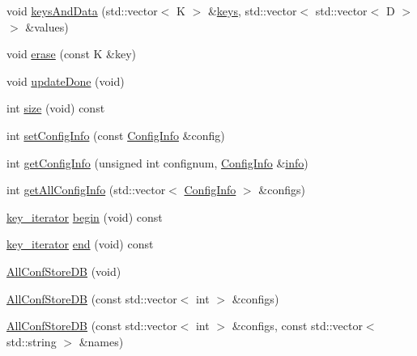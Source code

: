 \begin{DoxyCompactItemize}
void \mbox{\hyperlink{classFILEDB_1_1AllConfStoreDB_a9150983c712d6b870a75886f92b10a9d}{keys\+And\+Data}} (std\+::vector$<$ K $>$ \&\mbox{\hyperlink{classFILEDB_1_1ConfDataStoreDB_a794e05e3888ab95e0396a196b5a18e65}{keys}}, std\+::vector$<$ std\+::vector$<$ D $>$ $>$ \&values)
\item 
void \mbox{\hyperlink{classFILEDB_1_1AllConfStoreDB_afb092d33f9ca14ca30918d6cb8251fdb}{erase}} (const K \&key)
\item 
void \mbox{\hyperlink{classFILEDB_1_1AllConfStoreDB_ac90e596f6c914145130719ec5ac13593}{update\+Done}} (void)
\item 
int \mbox{\hyperlink{classFILEDB_1_1AllConfStoreDB_a78dd830c5211b3b00b8eae6170ffc9d6}{size}} (void) const
\item 
int \mbox{\hyperlink{classFILEDB_1_1AllConfStoreDB_a2062f555d190a3c52cc942447a090b8a}{set\+Config\+Info}} (const \mbox{\hyperlink{classFILEDB_1_1ConfigInfo}{Config\+Info}} \&config)
\item 
int \mbox{\hyperlink{classFILEDB_1_1AllConfStoreDB_a351639b9e19297abfa7b8b1aca013770}{get\+Config\+Info}} (unsigned int confignum, \mbox{\hyperlink{classFILEDB_1_1ConfigInfo}{Config\+Info}} \&\mbox{\hyperlink{structinfo}{info}})
\item 
int \mbox{\hyperlink{classFILEDB_1_1AllConfStoreDB_aeb8e6daf1a1f9b7a19899cf7db365632}{get\+All\+Config\+Info}} (std\+::vector$<$ \mbox{\hyperlink{classFILEDB_1_1ConfigInfo}{Config\+Info}} $>$ \&configs)
\item 
\mbox{\hyperlink{classFILEDB_1_1AllConfStoreDB_a2ce8981ca7049ed0c2c6e438873a9c1b}{key\+\_\+iterator}} \mbox{\hyperlink{classFILEDB_1_1AllConfStoreDB_a7bb7f812d80471897860af5692eb5bd2}{begin}} (void) const
\item 
\mbox{\hyperlink{classFILEDB_1_1AllConfStoreDB_a2ce8981ca7049ed0c2c6e438873a9c1b}{key\+\_\+iterator}} \mbox{\hyperlink{classFILEDB_1_1AllConfStoreDB_a213c914b326e7769411e305ceb375b1d}{end}} (void) const
\item 
\mbox{\hyperlink{classFILEDB_1_1AllConfStoreDB_a72b72501b29029e2bfb682565f96eac0}{All\+Conf\+Store\+DB}} (void)
\item 
\mbox{\hyperlink{classFILEDB_1_1AllConfStoreDB_a9a8553b0ce3ac82be098130d08f62162}{All\+Conf\+Store\+DB}} (const std\+::vector$<$ int $>$ \&configs)
\item 
\mbox{\hyperlink{classFILEDB_1_1AllConfStoreDB_ab8b213578395f0ac7d436a82f4a26fe1}{All\+Conf\+Store\+DB}} (const std\+::vector$<$ int $>$ \&configs, const std\+::vector$<$ std\+::string $>$ \&names)
\item 

\end{DoxyCompactItemize}
